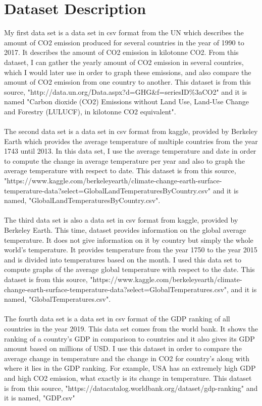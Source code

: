 \documentclass[fontsize=11pt]{article}
\begin{document}
\section*{Dataset Description}
My first data set is a data set in csv format from the UN which describes the amount of CO2 emission produced for several countries in the year of 1990 to 2017. It describes the amount of CO2 emission in kilotonne CO2.  From this dataset, I can gather the yearly amount of CO2 emission in several countries, which I would later use in order to graph these emissions, and also compare the amount of CO2 emission from one country to another. This dataset is from this source,  "http://data.un.org/Data.aspx?d=GHG&f=seriesID\%3aCO2" and it is named "Carbon dioxide (CO2) Emissions without Land Use, Land-Use Change and Forestry (LULUCF), in kilotonne CO2 equivalent".
\\
\\
The second data set is a data set in csv format from kaggle, provided by Berkeley Earth which provides the average temperature of multiple countries from the year 1743 until 2013. In this data set, I use the average temperature and date in order to compute the change in average temperature per year and also to graph the average temperature with respect to date. This dataset is from this source, "https://www.kaggle.com/berkeleyearth/climate-change-earth-surface-temperature-data?select=GlobalLandTemperaturesByCountry.csv" and it is named, "GlobalLandTemperaturesByCountry.csv".
\\\\
The third data set is also a data set in csv format from kaggle, provided by Berkeley Earth. This time, dataset provides information on the global average temperature. It does not give information on it by country but simply the whole world's temperature. It provides temperature from the year 1750 to the year 2015 and is divided into temperatures based on the month. I used this data set to compute graphs of the average global temperature with respect to the date. This dataset is from this source, "https://www.kaggle.com/berkeleyearth/climate-change-earth-surface-temperature-data?select=GlobalTemperatures.csv", and it is named, "GlobalTemperatures.csv".
\\\\
The fourth data set is a data set in csv format of the GDP ranking of all countries in the year 2019. This data set comes from the world bank. It shows the ranking of a country's GDP in comparison to countries and it also gives its GDP amount based on millions of USD. I use this dataset in order to compare the average change in temperature and the change in CO2 for country's along with where it lies in the GDP ranking. For example, USA has an extremely high GDP and high CO2 emission, what exactly is its change in temperature. This dataset is from this source, "https://datacatalog.worldbank.org/dataset/gdp-ranking" and it is named, "GDP.csv"
\end{document}
